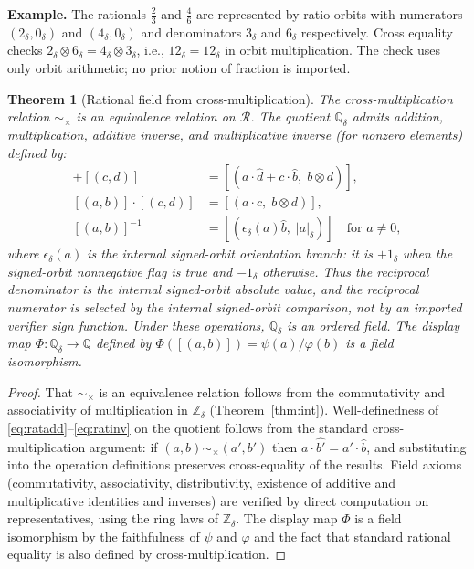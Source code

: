\documentclass[11pt,a4paper]{article}
\newtheorem{theorem}{Theorem}[section]
\theoremstyle{definition}
\theoremstyle{remark}
\begin{document}
\noindent\textbf{Example.} The rationals $\tfrac{2}{3}$ and $\tfrac{4}{6}$
are represented by ratio orbits with numerators $(2_\delta, 0_\delta)$ and
$(4_\delta, 0_\delta)$ and denominators $3_\delta$ and $6_\delta$
respectively. Cross equality checks
$2_\delta \otimes 6_\delta = 4_\delta \otimes 3_\delta$, i.e.,
$12_\delta = 12_\delta$ in orbit multiplication. The check uses only orbit
arithmetic; no prior notion of fraction is imported.

\begin{theorem}[Rational field from cross-multiplication]\label{thm:rat}
The cross-multiplication relation $\sim_\times$ is an equivalence relation on
$\mathcal{R}$. The quotient $\mathbb{Q}_\delta$ admits addition,
multiplication, additive inverse, and multiplicative inverse (for nonzero
elements) defined by:
\begin{align}
  [(a,b)] + [(c,d)] &= [(a \cdot \widehat{d} + c \cdot \widehat{b},\;
    b \otimes d)], \label{eq:ratadd} \\
  [(a,b)] \cdot [(c,d)] &= [(a \cdot c,\; b \otimes d)],
    \label{eq:ratmul} \\
  [(a,b)]^{-1} &= [(\epsilon_\delta(a)\widehat{b},\;
    |a|_\delta)] \quad \text{for } a \neq 0, \label{eq:ratinv}
\end{align}
where $\epsilon_\delta(a)$ is the internal signed-orbit orientation branch:
it is $+1_\delta$ when the signed-orbit nonnegative flag is true and
$-1_\delta$ otherwise. Thus the reciprocal denominator is the internal
signed-orbit absolute value, and the reciprocal numerator is selected by the
internal signed-orbit comparison, not by an imported verifier sign function.
Under these operations, $\mathbb{Q}_\delta$ is an ordered field. The display
map $\Phi : \mathbb{Q}_\delta \to \mathbb{Q}$ defined by
$\Phi([(a,b)]) = \psi(a) / \varphi(b)$ is a field isomorphism.
\end{theorem}

\begin{proof}
That $\sim_\times$ is an equivalence relation follows from the commutativity
and associativity of multiplication in $\mathbb{Z}_\delta$
(Theorem~\ref{thm:int}). Well-definedness of
\eqref{eq:ratadd}--\eqref{eq:ratinv} on the quotient follows from the
standard cross-multiplication argument: if $(a,b) \sim_\times (a',b')$ then
$a \cdot \widehat{b'} = a' \cdot \widehat{b}$, and substituting into the
operation definitions preserves cross-equality of the results. Field axioms
(commutativity, associativity, distributivity, existence of additive and
multiplicative identities and inverses) are verified by direct computation on
representatives, using the ring laws of $\mathbb{Z}_\delta$. The display map
$\Phi$ is a field isomorphism by the faithfulness of $\psi$ and $\varphi$ and
the fact that standard rational equality is also defined by
cross-multiplication.
\end{proof}
\end{document}
